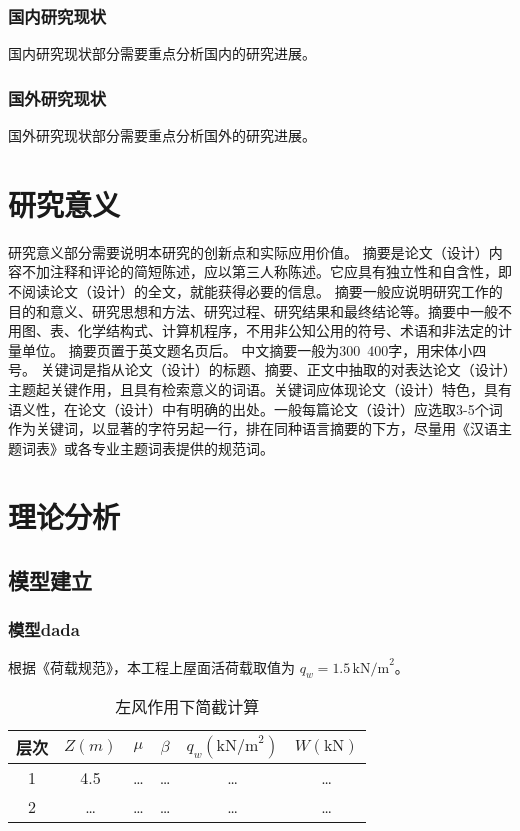 \documentclass{document}
\begin{document}
\subsubsection{国内研究现状}
国内研究现状部分需要重点分析国内的研究进展。

\subsubsection{国外研究现状}
国外研究现状部分需要重点分析国外的研究进展。

\section{研究意义}
研究意义部分需要说明本研究的创新点和实际应用价值。
摘要是论文（设计）内容不加注释和评论的简短陈述，应以第三人称陈述。它应具有独立性和自含性，即不阅读论文（设计）的全文，就能获得必要的信息。
摘要一般应说明研究工作的目的和意义、研究思想和方法、研究过程、研究结果和最终结论等。摘要中一般不用图、表、化学结构式、计算机程序，不用非公知公用的符号、术语和非法定的计量单位。\cite{YXXY20250307001}
摘要页置于英文题名页后。 
中文摘要一般为300~400字，用宋体小四号。 
关键词是指从论文（设计）的标题、摘要、正文中抽取的对表达论文（设计）主题起关键作用，且具有检索意义的词语。关键词应体现论文（设计）特色，具有语义性，在论文（设计）中有明确的出处。一般每篇论文（设计）应选取3-5个词作为关键词，以显著的字符另起一行，排在同种语言摘要的下方，尽量用《汉语主题词表》或各专业主题词表提供的规范词。\cite{10.1145/3583780.3615277}

\section{理论分析}
\subsection{模型建立}
\subsubsection{模型dada}
根据《荷载规范》，本工程上屋面活荷载取值为 $q_w = 1.5 \, \text{kN/m}^2$。

\begin{table}[htbp]
    \centering
    \caption{左风作用下简截计算}
    \begin{tabular}{cccccc}
      \toprule
      层次 & $Z(m)$ & $\mu$ & $\beta$ & $q_w (\text{kN/m}^2)$ & $W (\text{kN})$ \\
      \midrule
      1 & 4.5 & … & … & … & … \\
      2 & … & … & … & … & … \\
      \bottomrule
    \end{tabular}
  \end{table}
\end{document}
